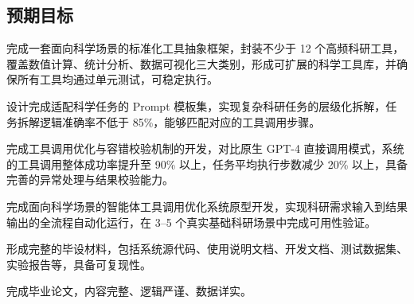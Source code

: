 \subsection{预期目标}

完成一套面向科学场景的标准化工具抽象框架，封装不少于 12 个高频科研工具，覆盖数值计算、统计分析、数据可视化三大类别，形成可扩展的科学工具库，并确保所有工具均通过单元测试，可稳定执行。

设计完成适配科学任务的 Prompt 模板集\cite{wang2023plansolve}，实现复杂科研任务的层级化拆解，任务拆解逻辑准确率不低于 85\%，能够匹配对应的工具调用步骤。

完成工具调用优化与容错校验机制的开发，对比原生 GPT-4 直接调用模式\cite{openai2023gpt4}，系统的工具调用整体成功率提升至 90\% 以上，任务平均执行步数减少 20\% 以上，具备完善的异常处理与结果校验能力。

完成面向科学场景的智能体工具调用优化系统原型开发，实现科研需求输入到结果输出的全流程自动化运行，在 3--5 个真实基础科研场景中完成可用性验证。

形成完整的毕设材料，包括系统源代码、使用说明文档、开发文档、测试数据集、实验报告等，具备可复现性。

完成毕业论文，内容完整、逻辑严谨、数据详实。
